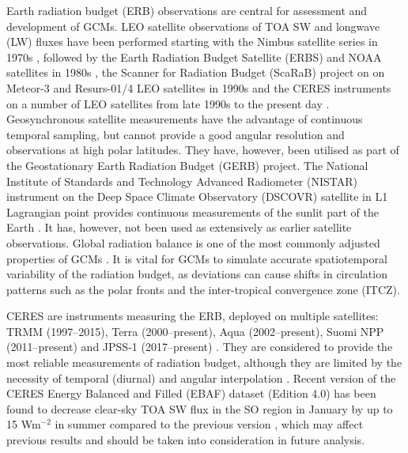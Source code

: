 Earth radiation budget (ERB) observations are central for assessment and development
of GCMs. LEO satellite observations of TOA SW and longwave (LW) fluxes
have been performed starting with the Nimbus satellite series in 1970s
\citep{smith1977}, followed by the Earth Radiation Budget Satellite (ERBS) and NOAA
satellites in 1980s \citep{barkstrom1984}, the Scanner for Radiation Budget (ScaRaB)
project on on Meteor-3 and Resurs-01/4 LEO satellites in 1990s \citep{kandel1994}
and the
CERES instruments on a number of LEO satellites from late 1990s
to the present day \citep{wielicki1996}. Geosynchronous satellite measurements
have the advantage of continuous temporal sampling, but cannot provide a
good angular resolution and observations at high polar latitudes. They have,
however, been utilised as part of the Geostationary Earth Radiation Budget (GERB)
project.
The National Institute of Standards and Technology Advanced Radiometer (NISTAR)
instrument on the Deep Space Climate Observatory (DSCOVR) satellite in L1 Lagrangian point provides continuous
measurements of the sunlit part of the Earth \citep{khlopenkov2017}. It has,
however, not been used
as extensively as earlier satellite observations. Global radiation balance
is one of the most commonly adjusted properties of GCMs
\citep{hourdin2017,schmidt2017}. It is vital for GCMs to simulate accurate
spatiotemporal variability of the radiation budget, as deviations can cause
shifts in circulation patterns such as the polar fronts and
the inter-tropical convergence zone (ITCZ).

CERES are instruments measuring the ERB,
deployed on multiple satellites:
TRMM (1997--2015), Terra (2000--present), Aqua (2002--present), Suomi NPP (2011--present) and JPSS-1
(2017--present) \citep{damadeo2017}. They are
considered to provide the most reliable measurements of radiation budget,
although they are limited by the necessity of temporal (diurnal) and angular
interpolation \citep{smith2011}.
Recent version of the CERES Energy Balanced and
Filled (EBAF) dataset (Edition 4.0) has been found to decrease
clear-sky TOA SW flux in the SO region in January by up to 15 Wm$^{-2}$
in summer compared to the previous version \citep{loeb2017},
which may affect previous results and should be taken into consideration in
future analysis.

